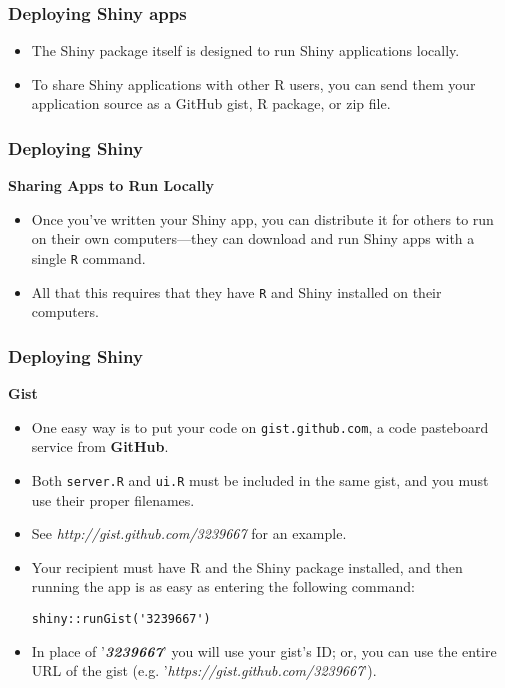 \documentclass{beamer}
\begin{document}
\begin{frame}
\frametitle{Deploying Shiny apps}
\Large
\vspace{-1cm}
\begin{itemize}
\item  The Shiny package itself is designed to run Shiny applications locally. 
\item To share Shiny applications with other R users, you can send them your application source as a GitHub gist, R package, or zip file.
\end{itemize}
\end{frame}

\begin{frame}
\frametitle{Deploying Shiny}
\Large
\textbf{Sharing Apps to Run Locally}
\begin{itemize}
\item Once you’ve written your Shiny app, you can distribute it for others to run on their own computers—they can download and run Shiny apps with a single \texttt{R} command.
\item  All that this requires that they have \texttt{R} and Shiny installed on their computers.


\end{itemize}

\end{frame}
\begin{frame}
\frametitle{Deploying Shiny}
\Large
\textbf{Gist}
\begin{itemize}
\item One easy way is to put your code on \texttt{gist.github.com}, a code pasteboard service from \textbf{GitHub}. 
\item Both \texttt{server.R} and \texttt{ui.R} must be included in the same gist, and you must use their proper filenames. 
\item See \textit{http://gist.github.com/3239667} for an example.
\end{itemize}
\end{frame}
\begin{frame}[fragile]
\Large
\begin{itemize}
\item Your recipient must have R and the Shiny package installed, and then running the app is as easy as entering the following command:

\begin{framed}
\begin{verbatim}
shiny::runGist('3239667')
\end{verbatim}
\end{framed}
\item In place of '\textit{\textbf{3239667}}' you will use your gist’s ID; or, you can use the entire URL of the gist (e.g. '\textit{https://gist.github.com/3239667}').
\end{itemize}
\end{frame}
\end{document}
